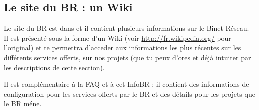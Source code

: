 
\subsection{Le site du BR : un Wiki}
\label{siteBR}

Le site du BR est dans  et il contient plusieurs
informations sur le Binet R\'eseau.
Il est pr\'esent\'e sous la forme d'un Wiki (voir \url{http://fr.wikipedia.org/} pour l'original)
et te permettra d'acceder aux informations les plus r\'ecentes sur les diff\'erents services offerts,
sur nos projets (que tu peux d'ores et d\'ej\`a intuiter par les descriptions de cette section).

Il est compl\'ementaire \`a la {\sc FAQ} et \`a cet InfoBR : il contient des informations
de configuration pour les services offerts par le BR et des d\'etails pour les projets que
le BR m\'ene.



